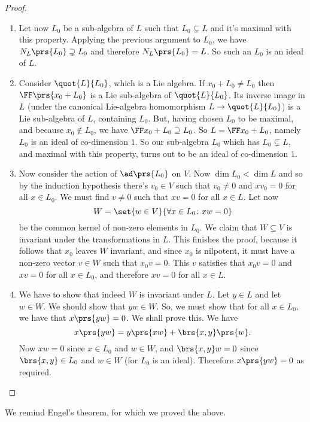\documentclass[10pt,a4paper,twoside,openany,hidelinks]{book}
\begin{document}
\begin{proof}
\begin{description}
\begin{enumerate}[label=(\Roman*)]
\item
Let now $L_0$ be a sub-algebra of $L$ such that $L_0 \subsetneq L$ and it's maximal with this property. Applying the previous argument to $L_0$, we have $N_L\prs{L_0} \supsetneq L_0$ and therefore $N_L\prs{L_0} = L$. So such an $L_0$ is an ideal of $L$.

\item
Consider $\quot{L}{L_0}$, which is a Lie algebra. If $x_0 + L_0 \neq L_0$ then $\FF\prs{x_0+L_0}$ is a Lie sub-algebra of $\quot{L}{L_0}$.
Its inverse image in $L$ (under the canonical Lie-algebra homomorphism $L \to \quot{L}{L_0}$) is a Lie sub-algebra of $L$, containing $L_0$.
But, having chosen $L_0$ to be maximal, and because $x_0 \notin L_0$, we have $\FF x_0 + L_0 \supseteq L_0$. So $L = \FF x_0 + L_0$, namely $L_0$ is an ideal of co-dimension $1$.
So our sub-algebra $L_0$ which has $L_0 \subsetneq L$, and maximal with this property, turns out to be an ideal of co-dimension $1$.

\item Now consider the action of $\ad \prs{L_0}$ on $V$. Now $\dim L_0 < \dim L$ and so by the induction hypothesis there's $v_0 \in V$ such that $v_0 \neq 0$ and $x v_0 = 0$ for all $x \in L_0$.
We must find $v \neq 0$ such that $xv = 0$ for all $x \in L$. Let now
\[W = \set{w\in V}{\forall x \in L_0 \colon xw = 0}\]
be the common kernel of non-zero elements in $L_0$.
We claim that $W \subseteq V$ is invariant under the transformations in $L$.
This finishes the proof, because it follows that $x_0$ leaves $W$ invariant, and since $x_0$ is nilpotent, it must have a non-zero vector $v \in W$ such that $x_0 v = 0$. This $v$ satisfies that $x_0v = 0$ and $xv = 0$ for all $x \in L_0$, and therefore $xv = 0$ for all $x \in L$.

\item We have to show that indeed $W$ is invariant under $L$. Let $y \in L$ and let $w \in W$. We should show that $yw \in W$. So, we must show that for all $x \in L_0$, we have that $x\prs{yw} = 0$. We shall prove this. We have
\[x\prs{yw} = y\prs{xw} + \brs{x,y}\prs{w}\text{.}\]
Now $xw = 0$ since $x \in L_0$ and $w \in W$, and $\brs{x,y}w = 0$ since $\brs{x,y} \in L_0$ and $w \in W$ (for $L_0$ is an ideal). Therefore
$x\prs{y w} = 0$ as required.
\end{enumerate}
\end{description}
\end{proof}
We remind Engel's theorem, for which we proved the above.
\end{document}
